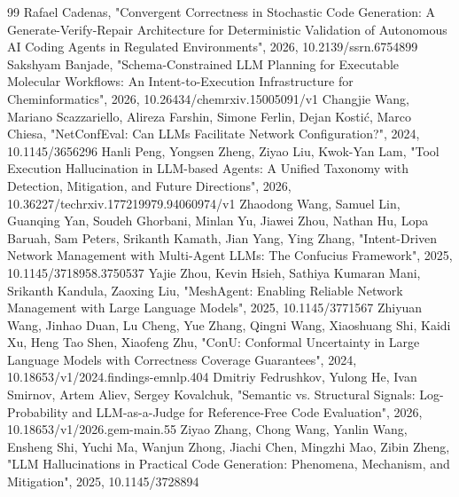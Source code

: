 \documentclass[conference]{IEEEtran}
\begin{document}
\begin{thebibliography}{99}
 Rafael Cadenas, "Convergent Correctness in Stochastic Code Generation: A Generate-Verify-Repair Architecture for Deterministic Validation of Autonomous AI Coding Agents in Regulated Environments", 2026, 10.2139/ssrn.6754899
 Sakshyam Banjade, "Schema-Constrained LLM Planning for Executable Molecular Workflows: An Intent-to-Execution Infrastructure for Cheminformatics", 2026, 10.26434/chemrxiv.15005091/v1
 Changjie Wang, Mariano Scazzariello, Alireza Farshin, Simone Ferlin, Dejan Kostić, Marco Chiesa, "NetConfEval: Can LLMs Facilitate Network Configuration?", 2024, 10.1145/3656296
 Hanli Peng, Yongsen Zheng, Ziyao Liu, Kwok-Yan Lam, "Tool Execution Hallucination in LLM-based Agents: A Unified Taxonomy with Detection, Mitigation, and Future Directions", 2026, 10.36227/techrxiv.177219979.94060974/v1
 Zhaodong Wang, Samuel Lin, Guanqing Yan, Soudeh Ghorbani, Minlan Yu, Jiawei Zhou, Nathan Hu, Lopa Baruah, Sam Peters, Srikanth Kamath, Jian Yang, Ying Zhang, "Intent-Driven Network Management with Multi-Agent LLMs: The Confucius Framework", 2025, 10.1145/3718958.3750537
 Yajie Zhou, Kevin Hsieh, Sathiya Kumaran Mani, Srikanth Kandula, Zaoxing Liu, "MeshAgent: Enabling Reliable Network Management with Large Language Models", 2025, 10.1145/3771567
 Zhiyuan Wang, Jinhao Duan, Lu Cheng, Yue Zhang, Qingni Wang, Xiaoshuang Shi, Kaidi Xu, Heng Tao Shen, Xiaofeng Zhu, "ConU: Conformal Uncertainty in Large Language Models with Correctness Coverage Guarantees", 2024, 10.18653/v1/2024.findings-emnlp.404
 Dmitriy Fedrushkov, Yulong He, Ivan Smirnov, Artem Aliev, Sergey Kovalchuk, "Semantic vs. Structural Signals: Log-Probability and LLM-as-a-Judge for Reference-Free Code Evaluation", 2026, 10.18653/v1/2026.gem-main.55
 Ziyao Zhang, Chong Wang, Yanlin Wang, Ensheng Shi, Yuchi Ma, Wanjun Zhong, Jiachi Chen, Mingzhi Mao, Zibin Zheng, "LLM Hallucinations in Practical Code Generation: Phenomena, Mechanism, and Mitigation", 2025, 10.1145/3728894
\end{thebibliography}
\end{document}
